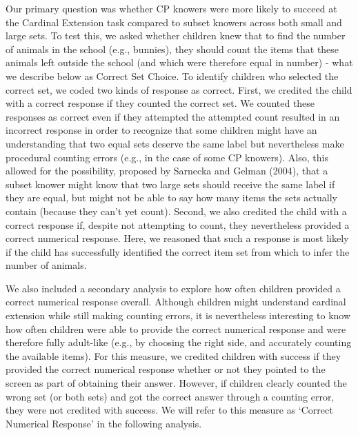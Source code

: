 \documentclass[
  man,floatsintext]{apa7}
\begin{document}
Our primary question was whether CP knowers were more likely to succeed at the Cardinal Extension task compared to subset knowers across both small and large sets. To test this, we asked whether children knew that to find the number of animals in the school (e.g., bunnies), they should count the items that these animals left outside the school (and which were therefore equal in number) - what we describe below as Correct Set Choice. To identify children who selected the correct set, we coded two kinds of response as correct. First, we credited the child with a correct response if they counted the correct set. We counted these responses as correct even if they attempted the attempted count resulted in an incorrect response in order to recognize that some children might have an understanding that two equal sets deserve the same label but nevertheless make procedural counting errors (e.g., in the case of some CP knowers). Also, this allowed for the possibility, proposed by Sarnecka and Gelman (2004), that a subset knower might know that two large sets should receive the same label if they are equal, but might not be able to say how many items the sets actually contain (because they can't yet count). Second, we also credited the child with a correct response if, despite not attempting to count, they nevertheless provided a correct numerical response. Here, we reasoned that such a response is most likely if the child has successfully identified the correct item set from which to infer the number of animals.

We also included a secondary analysis to explore how often children provided a correct numerical response overall. Although children might understand cardinal extension while still making counting errors, it is nevertheless interesting to know how often children were able to provide the correct numerical response and were therefore fully adult-like (e.g., by choosing the right side, and accurately counting the available items). For this measure, we credited children with success if they provided the correct numerical response whether or not they pointed to the screen as part of obtaining their answer. However, if children clearly counted the wrong set (or both sets) and got the correct answer through a counting error, they were not credited with success. We will refer to this measure as `Correct Numerical Response' in the following analysis.
\end{document}
